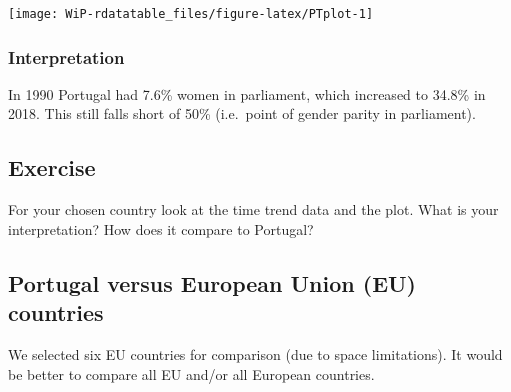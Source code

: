 \documentclass[a4paper,9pt,twocolumn,twoside,printwatermark=true]{pinp}
\begin{document}
\begin{center}\texttt{[image: WiP-rdatatable\_files/figure-latex/PTplot-1]} \end{center}

\subsubsection{Interpretation}\label{interpretation}

In 1990 Portugal had 7.6\% women in parliament, which increased to
34.8\% in 2018. This still falls short of 50\% (i.e.~point of gender
parity in parliament).

\subsection{Exercise}\label{exercise-4}

For your chosen country look at the time trend data and the plot. What
is your interpretation? How does it compare to Portugal?

\subsection{Portugal versus European Union (EU)
countries}\label{portugal-versus-european-union-eu-countries}

We selected six EU countries for comparison (due to space limitations).
It would be better to compare all EU and/or all European countries.

\begin{Shaded}
\end{Shaded}
\end{document}
